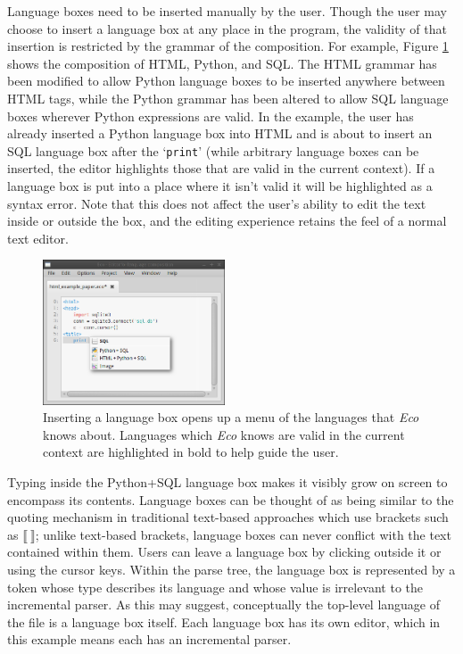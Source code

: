 \documentclass[sigplan,screen]{acmart}\settopmatter{printfolios=true,printccs=false,printacmref=false}
\newcommand{\eco}[0]{\emph{Eco}\xspace}
\begin{document}
Language boxes need to be inserted manually by the user. Though the user may
choose to insert a language box at any place in the program, the validity of
that insertion is restricted by the grammar of the composition. For example,
Figure \ref{fig:langmenu} shows the composition of HTML, Python, and SQL.  The
HTML grammar has been modified to allow Python language boxes to be inserted
anywhere between HTML tags, while the Python grammar has been altered to allow
SQL language boxes wherever Python expressions are valid.  In the example, the
user has already inserted a Python language box into HTML and is about to
insert an SQL language box after the `\texttt{print}' (while arbitrary language
boxes can be inserted, the editor highlights those that are valid in the
current context). If a language box is put into a place where it isn't valid it
will be highlighted as a syntax error. Note that this does not affect the
user's ability to edit the text inside or outside the box, and the editing
experience retains the feel of a normal text editor.

\begin{figure}[t]
\begin{center}
\includegraphics[width=0.48\textwidth]{images/dropdown.png}
\caption{Inserting a language box opens up a menu of the languages that \eco
knows about. Languages which \eco knows are valid in the current context are
highlighted in bold to help guide the user.}
\label{fig:langmenu}
\end{center}
\end{figure}

Typing inside the Python+SQL language box makes it visibly grow on screen to
encompass its contents. Language boxes can be thought of
as being similar to the quoting mechanism in traditional text-based approaches
which use brackets such as $\llbracket~\rrbracket$; unlike text-based brackets,
language boxes can never conflict with the text contained within them. Users can
leave a language box by clicking outside it or using the cursor keys.
Within the parse tree, the
language box is represented by a token whose type describes its language and whose
value is irrelevant to the incremental parser. As this may suggest, conceptually the top-level
language of the file is a language box itself. Each language
box has its own editor, which in this example means each has an incremental
parser.
\end{document}
